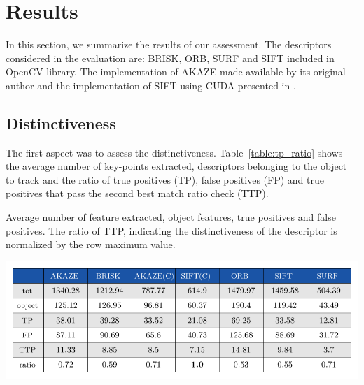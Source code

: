 \section{Results}

In this section, we summarize the results of our assessment. The descriptors considered in the evaluation are: BRISK, ORB, SURF and SIFT included in OpenCV library. The implementation of AKAZE made available by its original author \cite{alcantarilla13} and the implementation of SIFT using CUDA presented in \cite{bjorkmann14}.

\subsection{Distinctiveness}


The first aspect was to assess the distinctiveness. Table~\ref{table:tp_ratio} shows the average number of key-points extracted, descriptors belonging to the object to track and the ratio of true positives (TP), false positives (FP) and true positives that pass the second best match ratio check (TTP). 

\begin{table}[!h]
\caption{Average number of feature extracted, object features, true positives and false positives. The ratio of TTP, indicating the distinctiveness of the descriptor is normalized by the row maximum value.}
\vspace{-2mm} 
\centerline{%
		\includegraphics[width=0.98\linewidth]{tables/descriptivness_ratio_raw.pdf}}
    \vspace{-2mm} 
	\label{table:tp_ratio}
\end{table}

